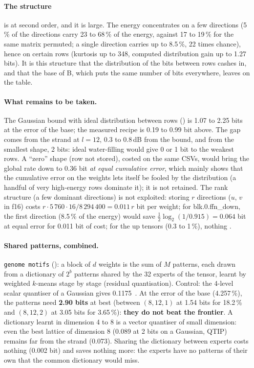 \paragraph{The structure} is at second order, and it is large. The energy concentrates on a few directions (5\,\% of the directions carry 23 to 68\,\% of the energy, against 17 to 19\,\% for the same matrix permuted; a single direction carries up to 8.5\,\%, 22 times chance), hence on certain rows (kurtosis up to 348, computed distribution gain up to 1.27 bits). It is this structure that the distribution of the bits between rows cashes in, and that the base of B, which puts the same number of bits everywhere, leaves on the table.

\paragraph{What remains to be taken.} The Gaussian bound with ideal distribution between rows () is 1.07 to 2.25 bits at the error of the base; the measured recipe is 0.19 to 0.99 bit above. The gap comes from the strand at $l = 12$, 0.3 to 0.8\,dB from the bound, and from the smallest shape, 2 bits: ideal water-filling would give 0 or 1 bit to the weakest rows. A ``zero'' shape (row not stored), costed on the same CSVs, would bring the global rate down to 0.36 bit \emph{at equal cumulative error}, which mainly shows that the cumulative error on the weights lets itself be fooled by the distribution (a handful of very high-energy rows dominate it); it is not retained. The rank structure (a few dominant directions) is not exploited: storing $r$ directions ($u$, $v$ in f16) costs $r \cdot 5\,760 \cdot 16 / 8\,294\,400 = 0.011\,r$ bit per weight; for blk.0.ffn\_down, the first direction (8.5\,\% of the energy) would save $\frac12\log_2(1/0.915) = 0.064$ bit at equal error for 0.011 bit of cost; for the up tensors (0.3 to 1\,\%), nothing \calc.

\paragraph{Shared patterns, combined.} \texttt{genome motifs} (): a block of $d$ weights is the sum of $M$ patterns, each drawn from a dictionary of $2^b$ patterns shared by the 32 experts of the tensor, learnt by weighted $k$-means stage by stage (residual quantisation). Control: the 4-level scalar quantiser of a Gaussian gives 0.1175~\cite{max1960}. At the error of the base (4.257\,\%), the patterns need \textbf{2.90 bits} at best (between $(8, 12, 1)$ at 1.54 bits for 18.2\,\% and $(8, 12, 2)$ at 3.05 bits for 3.65\,\%): \textbf{they do not beat the frontier}. A dictionary learnt in dimension 4 to 8 is a vector quantiser of small dimension: even the best lattice of dimension 8 (0.089 at 2 bits on a Gaussian, QTIP) remains far from the strand (0.073). Sharing the dictionary between experts costs nothing (0.002 bit) and saves nothing more: the experts have no patterns of their own that the common dictionary would miss.

